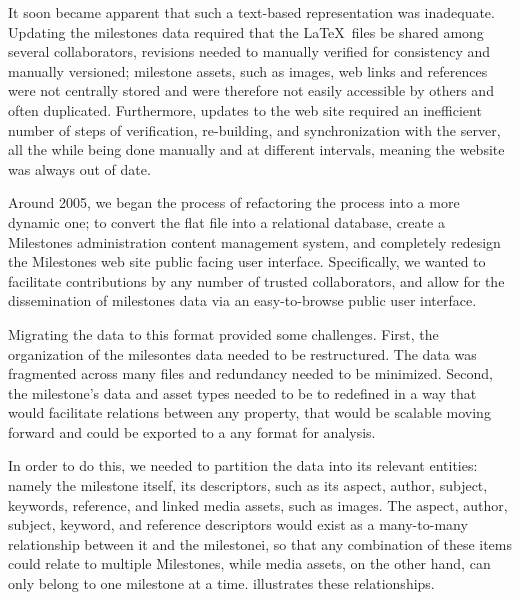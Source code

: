 It soon became apparent that such a text-based representation was inadequate. Updating the milestones data required that the \LaTeX\ files be shared among several collaborators, revisions needed to manually verified for consistency and manually versioned; milestone assets, such as images, web links and references were not centrally stored and were therefore not easily accessible by others and often duplicated. Furthermore, updates to the web site required an inefficient number of steps of verification, re-building, and synchronization with the server, all the while being done manually and at different intervals, meaning the website was always out of date.

Around 2005, we began the process of refactoring the process into a more dynamic one; to convert the flat file into a relational database, create a Milestones administration content management system, and completely redesign the Milestones web site public facing user interface. Specifically, we wanted to facilitate contributions by any number of trusted collaborators, and allow for the dissemination of milestones data via an easy-to-browse public user interface.

Migrating the data to this format provided some challenges. First, the organization of the milesontes data needed to be restructured. The data was fragmented across many files and redundancy needed to be minimized. Second, the milestone's data and asset types needed to be to redefined in a way that would facilitate relations between any property, that would be scalable moving forward and could be exported to a any format for analysis.

In order to do this, we needed to partition the data into its relevant entities: namely the milestone itself, its descriptors, such as its aspect, author, subject, keywords, reference, and linked media assets, such as images. The aspect, author, subject, keyword, and reference descriptors would exist as a many-to-many relationship between it and the milestonei, so that any combination of these items could relate to multiple Milestones, while media assets, on the other hand, can only belong to one milestone at a time.  illustrates these relationships.

